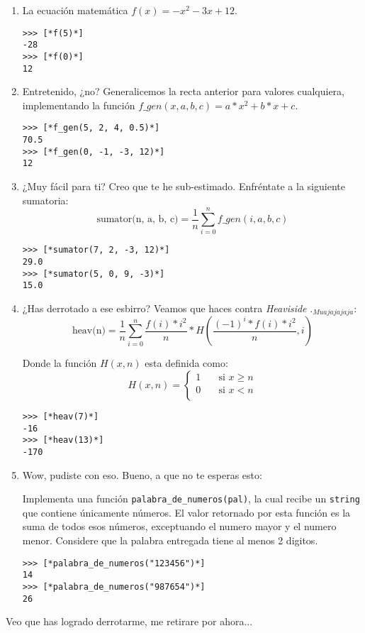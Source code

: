 \begin{enumerate}
    \item La ecuación matemática $f(x) = -x^{2} - 3x + 12$.
    \begin{lstlisting}[style=consola]
>>> [*f(5)*]
-28
>>> [*f(0)*]
12
    \end{lstlisting}
    
    \item Entretenido, ¿no? Generalicemos la recta anterior para valores cualquiera, implementando la función $f\_gen(x, a, b, c) = a*x^2 + b*x + c$.
    \begin{lstlisting}[style=consola]
>>> [*f_gen(5, 2, 4, 0.5)*]
70.5
>>> [*f_gen(0, -1, -3, 12)*]
12
    \end{lstlisting}

    \item ¿Muy fácil para ti? Creo que te he sub-estimado. Enfréntate a la siguiente sumatoria:
    \begin{equation*}
        \text{sumator(n, a, b, c)} = \frac{1}{n}\sum_{i=0}^{n}{f\_gen(i, a, b, c)}
    \end{equation*}
    \begin{lstlisting}[style=consola]
>>> [*sumator(7, 2, -3, 12)*]
29.0
>>> [*sumator(5, 0, 9, -3)*]
15.0
    \end{lstlisting}
    
    \item ¿Has derrotado a ese esbirro? Veamos que haces contra \textit{Heaviside} $._{Muajajajaja}$:
    \begin{equation*}
        \text{heav(n)} = \frac{1}{n}\sum_{i=0}^{n}\frac{f(i)*i^2}{n}*H\left(\frac{(-1)^i * f(i)*i^2}{n}, i\right)
    \end{equation*}
    
    Donde la función $H(x, n)$ esta definida como:
    \begin{equation*}
        H(x, n) = 
        \begin{cases}
        1 & \quad\text{si } x \geq n \\
        0 & \quad\text{si } x < n \\
     \end{cases}
    \end{equation*}

    \begin{lstlisting}[style=consola]
>>> [*heav(7)*]
-16
>>> [*heav(13)*]
-170
    \end{lstlisting}
    
    \item Wow, pudiste con eso. Bueno, a que no te esperas esto: 
    
    Implementa una función \texttt{palabra\_de\_numeros(pal)}, la cual recibe un \texttt{string} que contiene únicamente números. El valor retornado por esta función es la suma de todos esos números, exceptuando el numero mayor y el numero menor. Considere que la palabra entregada tiene al menos 2 digitos.
    
    \begin{lstlisting}[style=consola]
>>> [*palabra_de_numeros("123456")*]
14
>>> [*palabra_de_numeros("987654")*]
26
    \end{lstlisting}
\end{enumerate}

Veo que has logrado derrotarme, me retirare por ahora...
